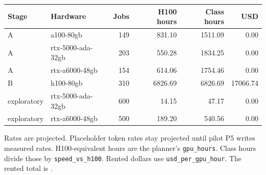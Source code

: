 \begin{tabular}{llrrrr}
\toprule
Stage & Hardware & Jobs & H100 hours & Class hours & USD \\
\midrule
A & a100-\allowbreak{}80gb & 149 & 831.10 & 1511.09 & 0.00 \\
A & rtx-\allowbreak{}5000-\allowbreak{}ada-\allowbreak{}32gb & 203 & 550.28 & 1834.25 & 0.00 \\
A & rtx-\allowbreak{}a6000-\allowbreak{}48gb & 154 & 614.06 & 1754.46 & 0.00 \\
B & h100-\allowbreak{}80gb & 310 & 6826.69 & 6826.69 & 17066.74 \\
exploratory & rtx-\allowbreak{}5000-\allowbreak{}ada-\allowbreak{}32gb & 600 & 14.15 & 47.17 & 0.00 \\
exploratory & rtx-\allowbreak{}a6000-\allowbreak{}48gb & 500 & 189.20 & 540.56 & 0.00 \\
\bottomrule
\end{tabular}

Rates are projected. Placeholder token rates stay projected until pilot P5 writes measured rates. H100-equivalent hours are the planner's \texttt{gpu\_hours}. Class hours divide those by \texttt{speed\_vs\_h100}. Rented dollars use \texttt{usd\_per\_gpu\_hour}. The rented total is \PlanRentedUsd{}.

